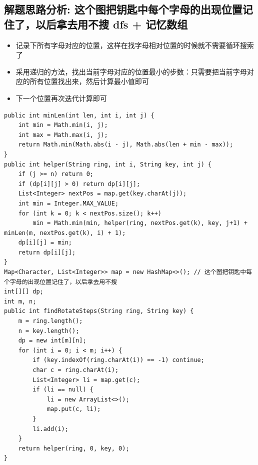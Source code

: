 \documentclass[9pt, b5paaper]{book}
\begin{document}
\subsection{解题思路分析: 这个图把钥匙中每个字母的出现位置记住了，以后拿去用不搜 dfs + 记忆数组}
\label{sec-1-14-1}
\begin{itemize}
\item 记录下所有字母对应的位置，这样在找字母相对位置的时候就不需要循环搜索了
\item 采用递归的方法，找出当前字母对应的位置最小的步数：只需要把当前字母对应的所有位置找出来，然后计算最小值即可
\item 下一个位置再次迭代计算即可
\end{itemize}
\begin{verbatim}
public int minLen(int len, int i, int j) {
    int min = Math.min(i, j);
    int max = Math.max(i, j);
    return Math.min(Math.abs(i - j), Math.abs(len + min - max));
}
public int helper(String ring, int i, String key, int j) {
    if (j >= n) return 0;
    if (dp[i][j] > 0) return dp[i][j];
    List<Integer> nextPos = map.get(key.charAt(j));
    int min = Integer.MAX_VALUE;
    for (int k = 0; k < nextPos.size(); k++) 
        min = Math.min(min, helper(ring, nextPos.get(k), key, j+1) + minLen(m, nextPos.get(k), i) + 1);
    dp[i][j] = min;
    return dp[i][j];
}
Map<Character, List<Integer>> map = new HashMap<>(); // 这个图把钥匙中每个字母的出现位置记住了，以后拿去用不搜
int[][] dp;
int m, n;
public int findRotateSteps(String ring, String key) {
    m = ring.length();
    n = key.length();
    dp = new int[m][n];
    for (int i = 0; i < m; i++) {
        if (key.indexOf(ring.charAt(i)) == -1) continue;
        char c = ring.charAt(i);
        List<Integer> li = map.get(c);
        if (li == null) {
            li = new ArrayList<>();
            map.put(c, li);
        }
        li.add(i);
    }
    return helper(ring, 0, key, 0);
}
\end{verbatim}
\end{document}
